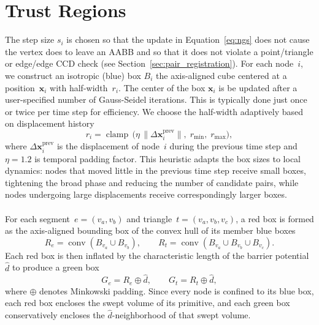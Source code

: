 \documentclass[acmtog,anonymous,review]{acmart}
\DeclareMathOperator{\conv}{conv}
\begin{document}
\section{Trust Regions} \label{sec:box_construction}
The step size $s_i$ is chosen so that the update in Equation~\ref{eq:ngs} does not cause the vertex does to leave an AABB and so that it does not violate a point/triangle or edge/edge CCD check (see Section~\ref{sec:pair_registration}).
For each node~$i$, we construct an isotropic (blue) box $B_i$ the axis-aligned cube centered at a position~$\mathbf{x}_i$ with half-width~$r_i$.
The center of the box $\mathbf{x}_i$ is be updated after a user-specified number of Gauss-Seidel iterations.
This is typically done just once or twice per time step for efficiency.
We choose the half-width adaptively based on displacement history
\begin{equation}
  r_i = \operatorname{clamp} \, \!\bigl(
    \eta\,\|\Delta\mathbf{x}_i^{\mathrm{prev}}\|,\;
    r_{\min},\; r_{\max}
  \bigr),
  \label{eq:blue_radius}
\end{equation}
where $\Delta\mathbf{x}_i^{\mathrm{prev}}$ is the displacement of node~$i$ during the previous time step and $\eta=1.2$ is temporal padding factor. 
This heuristic adapts the box sizes to local dynamics: nodes that
moved little in the previous time step receive small boxes, tightening
the broad phase and reducing the number of candidate pairs, while
nodes undergoing large displacements receive correspondingly larger
boxes.\\
\\
For each segment~$e=(v_a,v_b)$ and triangle~$t=(v_a,v_b,v_c)$, a
red box is formed as the axis-aligned bounding box of the convex hull of
its member blue boxes
\begin{equation}
  R_e = \conv(B_{v_a} \cup B_{v_b}),
  \qquad
  R_t = \conv(B_{v_a} \cup B_{v_b} \cup B_{v_c}).
  \label{eq:red_box}
\end{equation}
Each red box is then inflated by the characteristic length of the barrier potential $\hat{d}$ to produce a green box
\begin{equation}
  G_e = R_e \oplus \hat{d},
  \qquad
  G_t = R_t \oplus \hat{d},
  \label{eq:green_box}
\end{equation}
where $\oplus$ denotes Minkowski padding. 
Since every node is
confined to its blue box, each red box encloses the swept volume of
its primitive, and each green box conservatively encloses the
$\hat{d}$-neighborhood of that swept volume.
\end{document}
